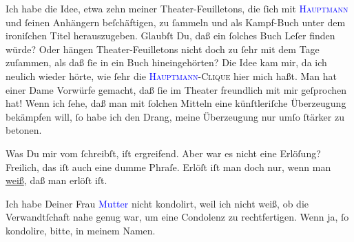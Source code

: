 \pstart
           Ich habe die Idee, etwa zehn meiner Theater-Feuilletons, die ſich mit \textsc{\textcolor{blue}{Hauptmann}{}\ledrightnote{\textcolor{blue}{Gerhart Hauptmann}}} und ſeinen Anhängern beſchäftigen, {\pb}zu ſammeln
               und als Kampf-Buch unter dem ironiſchen Titel \label{K_L03204-14v}\label{K_L03204-14h} herauszugeben. Glaubſt Du, daß ein ſolches Buch Leſer finden
               würde? Oder hängen Theater-Feuilletons nicht doch zu ſehr mit dem Tage zuſammen, als
               daß ſie in ein Buch hineingehörten? Die Idee kam mir, da ich neulich wieder hörte,
               wie ſehr die \textsc{\textcolor{blue}{Hauptmann}{}\ledrightnote{\textcolor{blue}{Gerhart Hauptmann}}-Clique} hier mich haßt. Man
               hat einer Dame Vorwürfe gemacht, daß ſie im Theater freundlich mit mir geſprochen
               hat! Wenn ich ſehe, daß man mit ſolchen Mitteln eine künſtleriſche Überzeugung {\pb}bekämpfen will, ſo habe ich den Drang, meine
               Überzeugung nur umſo ſtärker zu betonen.\pend
           
\pstart
           Was Du mir vom \label{K_L03204-23v}\label{K_L03204-23h} ſchreibſt, iſt ergreifend. Aber
                   war es nicht eine Erlöſung? Freilich, das iſt
               auch eine dumme Phraſe. Erlöſt iſt man doch nur, wenn man \uline{weiß}, daß man erlöſt iſt.\pend
           
\pstart
           Ich habe Deiner Frau \textcolor{blue}{Mutter}{}\ledrightnote{{$\rightarrow$}\textcolor{blue}{Louise Schnitzler}}
               nicht kondolirt, weil ich nicht weiß, ob die Verwandtſchaft nahe genug war, um eine
               Condolenz zu rechtfertigen. Wenn ja, ſo {\pb}kondolire,
               bitte, in meinem Namen.\pend
           
